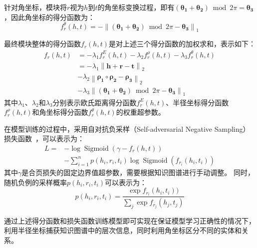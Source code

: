 \documentclass[algorithmlist, AutoFakeBold, AutoFakeSlant, figurelist, tablelist, nomlist, engineering, openany]{seuthesix} %
\begin{document}
针对角坐标，模块将$r$视为$h$到$t$的角坐标变换过程，即有$(\bm{\theta_1} + \bm{\theta_2}) \bmod 2 \pi = \bm{\theta_3}$，因此角坐标的得分函数为：
\begin{equation}
  f^{\theta}_r\left(h, t\right) =-\left\|\left(\bm{\theta_1}+\bm{\theta_2}\right) \bmod 2 \pi - \bm{\theta_3}\right\|_1
\end{equation}

最终模块整体的得分函数$f_r(h, t)$是对上述三个得分函数的加权求和，表示如下：
\begin{equation}
  \begin{aligned}
    f_r\left(h, t\right) &= -\lambda_1 f^{E}_r(h, t) -\lambda_2 f^{\rho}_r(h, t) -\lambda_3 f^{\theta}_r(h, t) \\
    &= -\lambda_1 \left\|\bm{h} + \bm{r} - \bm{t}\right\|_2 \\
    &-\lambda_2 \left\|\bm{\rho_1} \circ \bm{\rho_2} - \bm{\rho_3}\right\|_2 \\
    &-\lambda_3 \left\|\left(\bm{\theta_1}+\bm{\theta_2}\right) \bmod 2 \pi - \bm{\theta_3}\right\|_1
  \end{aligned}
  \label{f_1}
\end{equation}
其中$\lambda_1$、$\lambda_2$和$\lambda_3$分别表示欧氏距离得分函数$f^E_r(h, t)$、半径坐标得分函数$f^{\rho}_r(h, t)$和角坐标得分函数$f^{\theta}_r(h, t)$的权重超参数。

在模型训练的过程中，采用自对抗负采样（Self-adversarial Negative Sampling）损失函数~\cite{sun2018rotate}，可以表示为：
\begin{equation}
  \begin{aligned}
  L= & -\log \operatorname{Sigmoid}\left(\gamma-f_r(h, t)\right) \\
  & -\sum_{i=1}^n p\left(h_i, r_i, t_i\right) \log \operatorname{Sigmoid}(f_{r_i}(h_i, t_i))
  \end{aligned}
  \label{loss_1}
\end{equation}
其中$\gamma$是合页损失的固定边界值超参数，需要根据知识图谱进行手动调整。
同时，随机负例的采样概率$p(h_i, r_i, t_i)$可以表示为：
\begin{equation}
  p(h_i, r_i, t_i)=\frac{\exp f_{r_i}(h_i, t_i))}{\sum_j \exp f_{r_j}(h_j, t_j)}
\end{equation}

通过上述得分函数和损失函数训练模型即可实现在保证模型学习正确性的情况下，利用半径坐标捕获知识图谱中的层次信息，同时利用角坐标区分不同的实体和关系。

\end{document}
